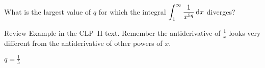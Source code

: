 
\begin{question}[2016Q4]
What is the largest value of $q$ for which the integral
$\displaystyle \int_1^\infty \frac1{x^{5q}}\,\mathrm{d}x$ diverges?
\end{question}

\begin{hint}
Review Example  in the
CLP--II text. Remember the antiderivative of $\frac{1}{x}$ looks very different from the antiderivative of other powers of $x$.
\end{hint}

\begin{answer}
$q=\frac{1}{5}$
\end{answer}

